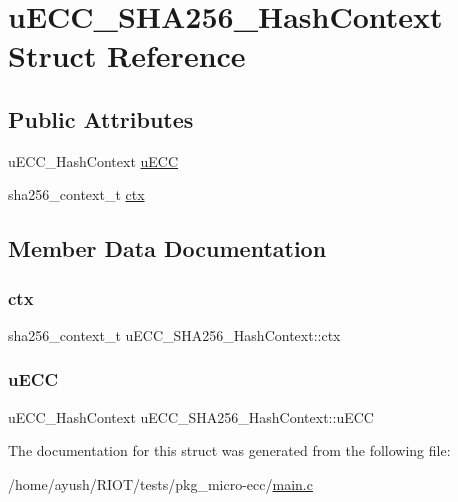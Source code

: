 \hypertarget{structuECC__SHA256__HashContext}{}\section{u\+E\+C\+C\+\_\+\+S\+H\+A256\+\_\+\+Hash\+Context Struct Reference}
\label{structuECC__SHA256__HashContext}
\subsection*{Public Attributes}
\begin{DoxyCompactItemize}
\item 
u\+E\+C\+C\+\_\+\+Hash\+Context \hyperlink{structuECC__SHA256__HashContext_af5b8fc818f71e228029f327e7b62d1f7}{u\+E\+CC}
\item 
sha256\+\_\+context\+\_\+t \hyperlink{structuECC__SHA256__HashContext_ae35ab793f4414d09ddc4f589a355851a}{ctx}
\end{DoxyCompactItemize}


\subsection{Member Data Documentation}
\mbox{\label{structuECC__SHA256__HashContext_ae35ab793f4414d09ddc4f589a355851a}} 
\subsubsection{\texorpdfstring{ctx}{ctx}}
{\footnotesize\ttfamily sha256\+\_\+context\+\_\+t u\+E\+C\+C\+\_\+\+S\+H\+A256\+\_\+\+Hash\+Context\+::ctx}

\mbox{\label{structuECC__SHA256__HashContext_af5b8fc818f71e228029f327e7b62d1f7}} 
\subsubsection{\texorpdfstring{u\+E\+CC}{uECC}}
{\footnotesize\ttfamily u\+E\+C\+C\+\_\+\+Hash\+Context u\+E\+C\+C\+\_\+\+S\+H\+A256\+\_\+\+Hash\+Context\+::u\+E\+CC}



The documentation for this struct was generated from the following file\+:\begin{DoxyCompactItemize}
\item 
/home/ayush/\+R\+I\+O\+T/tests/pkg\+\_\+micro-\/ecc/\hyperlink{pkg__micro-ecc_2main_8c}{main.\+c}\end{DoxyCompactItemize}
